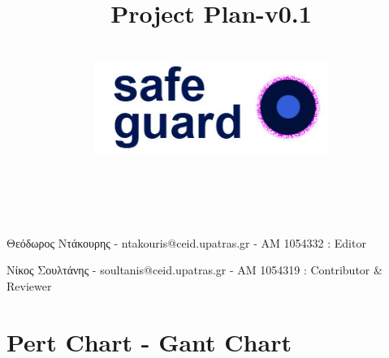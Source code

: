 \documentclass{article}
\title{Project Plan-v0.1}
\author{\\
\includegraphics[width=3in]{safeguard}\\[1ex]\\\\
}
\begin{document}
\maketitle

\newpage


Θεόδωρος Ντάκουρης - ntakouris@ceid.upatras.gr - ΑΜ 1054332 : Editor 


Νίκος Σουλτάνης - soultanis@ceid.upatras.gr - ΑΜ 1054319 : Contributor & Reviewer

\renewcommand{\contentsname}{Περιεχόμενα}
\tableofcontents

\section{Pert Chart - Gant Chart}
\begin{figure}
\end{figure}
\end{document}
